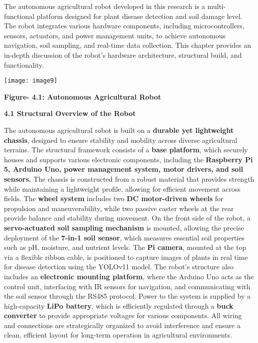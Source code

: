 \documentclass{book} %
\begin{document}
\noindent The autonomous agricultural robot developed in this research is a multi-functional platform designed for plant disease detection and soil damage level. The robot integrates various hardware components, including microcontrollers, sensors, actuators, and power management units, to achieve autonomous navigation, soil sampling, and real-time data collection. This chapter provides an in-depth discussion of the robot's hardware architecture, structural build, and functionality.

\noindent \texttt{[image: image9]}

\textbf{                                      Figure- 4.1: Autonomous Agricultural Robot}

\noindent \textbf{}

\noindent \textbf{}

\noindent \textbf{}

\noindent \textbf{}

\noindent \textbf{4.1 Structural Overview of the Robot}

\noindent The autonomous agricultural robot is built on a \textbf{durable yet lightweight chassis}, designed to ensure stability and mobility across diverse agricultural terrains. The structural framework consists of a \textbf{base platform}, which securely houses and supports various electronic components, including the \textbf{Raspberry Pi 5, Arduino Uno, power management system, motor drivers, and soil sensors.} The chassis is constructed from a robust material that provides strength while maintaining a lightweight profile, allowing for efficient movement across fields. The \textbf{wheel system} includes two \textbf{DC motor-driven wheels} for propulsion and maneuverability, while two passive caster wheels at the rear provide balance and stability during movement. On the front side of the robot, a \textbf{servo-actuated soil sampling mechanism} is mounted, allowing the precise deployment of the \textbf{7-in-1 soil sensor}, which measures essential soil properties such as pH, moisture, and nutrient levels. The \textbf{Pi camera}, mounted at the top via a flexible ribbon cable, is positioned to capture images of plants in real time for disease detection using the YOLOv11 model. The robot's structure also includes an \textbf{electronic mounting platform}, where the Arduino Uno acts as the control unit, interfacing with IR sensors for navigation, and communicating with the soil sensor through the RS485 protocol. Power to the system is supplied by a high-capacity \textbf{LiPo battery}, which is efficiently regulated through a \textbf{buck converter} to provide appropriate voltages for various components. All wiring and connections are strategically organized to avoid interference and ensure a clean, efficient layout for long-term operation in agricultural environments.
\end{document}

